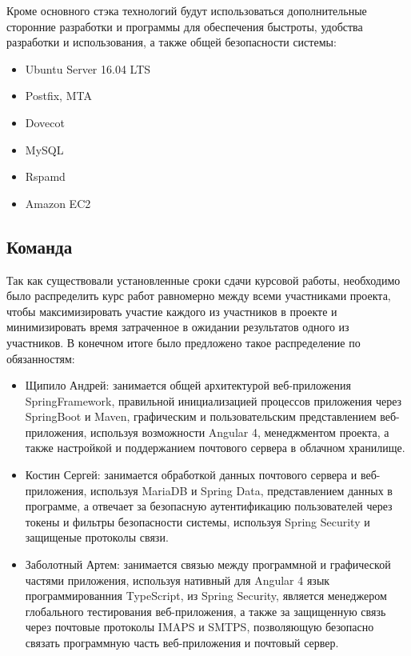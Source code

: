 \documentclass{article}
\begin{document}
Кроме основного стэка технологий будут использоваться дополнительные сторонние разработки и программы для обеспечения быстроты, удобства разработки и использования, а также общей безопасности системы: \\

\begin{itemize}
\item Ubuntu Server 16.04 LTS
\item Postfix, MTA
\item Dovecot
\item MySQL
\item Rspamd
\item Amazon EC2
\end{itemize}

\subsection{Команда}
Так как существовали установленные сроки сдачи курсовой работы, необходимо было распределить курс работ равномерно между всеми участниками проекта, чтобы максимизировать участие каждого из участников в проекте и минимизировать время затраченное в ожидании результатов одного из участников.
В конечном итоге было предложено такое распределение по обязанностям:
\begin{itemize}
\item Щипило Андрей: занимается общей архитектурой веб-приложения SpringFramework, правильной инициализацией процессов приложения через SpringBoot и Maven, графическим и пользовательским представлением веб-приложения, используя возможности Angular 4, менеджментом проекта, а также настройкой и поддержанием почтового сервера в облачном хранилище.

\item Костин Сергей: занимается обработкой данных почтового сервера и веб-приложения, используя MariaDB и Spring Data, представлением данных в программе, а отвечает за безопасную аутентификацию пользователей через токены и фильтры безопасности системы, используя Spring Security и защищеные протоколы связи.

\item Заболотный Артем: занимается связью между программной и графической частями приложения, используя нативный для Angular 4 язык программированния TypeScript,  из Spring Security, является менеджером глобального тестирования веб-приложения, а также за защищенную связь через почтовые протоколы IMAPS и SMTPS, позволяющую безопасно связать программную часть веб-приложения и почтовый сервер.
\end{itemize}
\newpage
\end{document}

